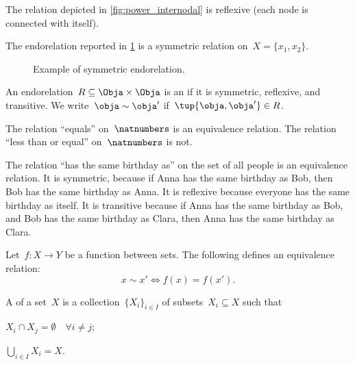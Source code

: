 \begin{example}
    The relation depicted in \cref{fig:power_internodal} is reflexive (each node is connected with itself).
\end{example}

\begin{example}
    The endorelation reported in \cref{fig:ex_sym_rel} is a symmetric relation on~$X=\{x_1,x_2\}$.
    \begin{figure}[h!]
        \begin{center}
        \end{center}
        \caption{Example of symmetric endorelation.}
        \label{fig:ex_sym_rel}
    \end{figure}
\end{example}
\begin{definition}\label{def:equivalence-relation}
    An endorelation~$R\subseteq \Obja\times \Obja$ is an \emph{} if it is symmetric, reflexive, and transitive. We write~$\obja\sim \obja'$ if~$\tup{\obja,\obja'}\in R$.
\end{definition}

\begin{example}
    The relation ``equals'' on~$\natnumbers$ is an equivalence relation. The relation ``less than or equal'' on~$\natnumbers$ is not.
\end{example}

\begin{example}
    The relation ``has the same birthday as'' on the set of all people is an equivalence relation. It is symmetric, because if Anna has the same birthday as Bob, then Bob has the same birthday as Anna. It is reflexive because everyone has the same birthday as itself. It is transitive because if Anna has the same birthday as Bob, and Bob has the same birthday as Clara, then Anna has the same birthday as Clara.
\end{example}

\begin{example}
    Let~$f\colon X\to Y$ be a function between sets. The following defines an equivalence relation:
    \begin{equation*}
        x\sim x'\Leftrightarrow f(x)=f(x').
    \end{equation*}
\end{example}

\begin{definition}[Partition]\label{def:partition}
    A \emph{} of a set~$X$ is a collection~$\{X_i\}_{i\in I}$ of subsets~$X_i\subseteq X$ such that
    \begin{compactenum}
        \item $X_i\cap X_j=\emptyset \quad \forall i\neq j$;
        \item $\bigcup_{i\in I}X_i=X$.
    \end{compactenum}
\end{definition}

